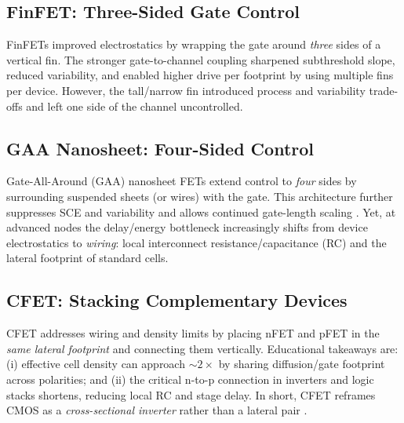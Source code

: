 \documentclass[conference]{IEEEtran}
\begin{document}
\subsection{FinFET: Three-Sided Gate Control}
FinFETs improved electrostatics by wrapping the gate around \emph{three} sides of a vertical fin.
The stronger gate-to-channel coupling sharpened subthreshold slope, reduced variability, and enabled higher drive per footprint by using multiple fins per device.
However, the tall/narrow fin introduced process and variability trade-offs and left one side of the channel uncontrolled.

\subsection{GAA Nanosheet: Four-Sided Control}
Gate-All-Around (GAA) nanosheet FETs extend control to \emph{four} sides by surrounding suspended sheets (or wires) with the gate.
This architecture further suppresses SCE and variability and allows continued gate-length scaling \cite{bsimcmg_sispad2017}.
Yet, at advanced nodes the delay/energy bottleneck increasingly shifts from device electrostatics to \emph{wiring}: local interconnect resistance/capacitance (RC) and the lateral footprint of standard cells.

\subsection{CFET: Stacking Complementary Devices}
CFET addresses wiring and density limits by placing nFET and pFET in the \emph{same lateral footprint} and connecting them vertically.
Educational takeaways are:
(i) effective cell density can approach $\sim 2\times$ by sharing diffusion/gate footprint across polarities; and
(ii) the critical n-to-p connection in inverters and logic stacks shortens, reducing local RC and stage delay.
In short, CFET reframes CMOS as a \emph{cross-sectional inverter} rather than a lateral pair \cite{imec_cfet_iedm2020}.
\end{document}
